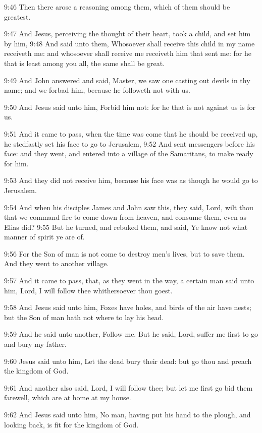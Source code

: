 9:46 Then there arose a reasoning among them, which of them should be greatest.

9:47 And Jesus, perceiving the thought of their heart, took a child, and set him by him, 9:48 And said unto them, Whosoever shall receive this child in my name receiveth me: and whosoever shall receive me receiveth him that sent me: for he that is least among you all, the same shall be great.

9:49 And John answered and said, Master, we saw one casting out devils in thy name; and we forbad him, because he followeth not with us.

9:50 And Jesus said unto him, Forbid him not: for he that is not against us is for us.

9:51 And it came to pass, when the time was come that he should be received up, he stedfastly set his face to go to Jerusalem, 9:52 And sent messengers before his face: and they went, and entered into a village of the Samaritans, to make ready for him.

9:53 And they did not receive him, because his face was as though he would go to Jerusalem.

9:54 And when his disciples James and John saw this, they said, Lord, wilt thou that we command fire to come down from heaven, and consume them, even as Elias did?  9:55 But he turned, and rebuked them, and said, Ye know not what manner of spirit ye are of.

9:56 For the Son of man is not come to destroy men's lives, but to save them. And they went to another village.

9:57 And it came to pass, that, as they went in the way, a certain man said unto him, Lord, I will follow thee whithersoever thou goest.

9:58 And Jesus said unto him, Foxes have holes, and birds of the air have nests; but the Son of man hath not where to lay his head.

9:59 And he said unto another, Follow me. But he said, Lord, suffer me first to go and bury my father.

9:60 Jesus said unto him, Let the dead bury their dead: but go thou and preach the kingdom of God.

9:61 And another also said, Lord, I will follow thee; but let me first go bid them farewell, which are at home at my house.

9:62 And Jesus said unto him, No man, having put his hand to the plough, and looking back, is fit for the kingdom of God.


